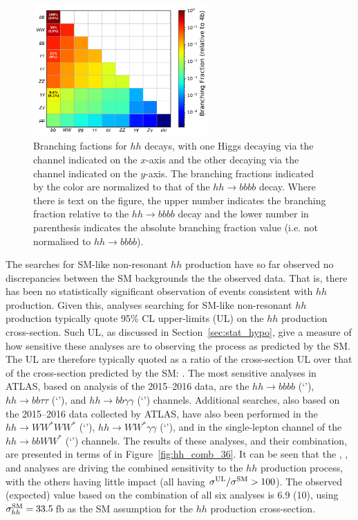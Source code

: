 \begin{figure}[!htb]
    \begin{center}
        \includegraphics[width=0.6\textwidth]{figures/search_hh/hh_br}
        \caption{
            Branching factions for $hh$ decays, with one Higgs decaying via the channel
            indicated on the $x$-axis and the other decaying via the channel indicated on the $y$-axis.
            The branching fractions indicated by the color are normalized to that of the $hh \rightarrow bbbb$
            decay.
            Where there is text on the figure, the upper number indicates the branching fraction
            relative to the $hh\rightarrow bbbb$ decay and the lower number in parenthesis indicates the absolute
            branching fraction value (i.e. not normalised to $hh \rightarrow bbbb$).
        }
        \label{fig:hh_br}
    \end{center}
\end{figure}

The searches for SM-like non-resonant $hh$ production have so far observed no discrepancies
between the SM backgrounds the the observed data.
That is, there has been no statistically significant observation of events consistent with $hh$ production.
Given this, analyses searching for SM-like non-resonant $hh$ production typically quote 95\% CL
upper-limits (UL) on the $hh$ production cross-section.
Such UL, as discussed in Section~\ref{sec:stat_hypo}, give a measure of how sensitive these analyses
are to observing the process as predicted by the SM.
The UL are therefore typically quoted as a ratio of the cross-section UL over that of the cross-section
predicted by the SM: \sigmaRatio.
The most sensitive analyses in ATLAS, based on analysis of the 2015--2016 data, are the $hh \rightarrow bbbb$ (`\bbbb'), $hh \rightarrow bb\tau\tau$ (`\bbtautau'),
and $hh \rightarrow bb\gamma\gamma$ (`\bbyy') channels.
Additional searches, also based on the 2015--2016 data collected by ATLAS, have also been performed
in the $hh \rightarrow WW^*WW^*$ (`\wwww'), $hh \rightarrow WW^* \gamma \gamma$ (`\wwyy'),
and in the single-lepton channel of the $hh \rightarrow bbWW^*$ (`\bbww') channels.
The results of these analyses, and their combination, are presented in terms of \sigmaRatio in Figure~\ref{fig:hh_comb_36}.
It can be seen that the \bbtautau, \bbbb, and \bbyy analyses are driving the combined sensitivity
to the $hh$ production process, with the others having little impact (all having $\sigma^{\text{UL}} / \sigma^{\text{SM}} >100$).
The observed (expected) \sigmaRatio value based on the combination of all six analyses is 6.9 (10), using
$\sigma_{hh}^{\text{SM}} = 33.5$\,fb as the SM assumption for the $hh$ production cross-section.

